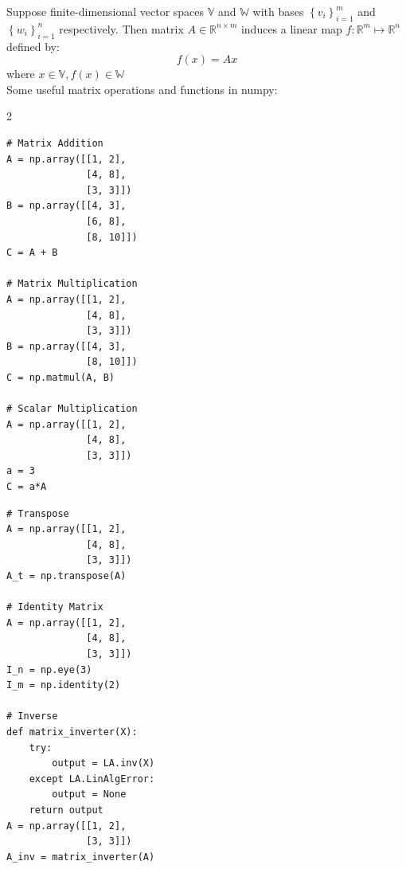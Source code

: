 Suppose finite-dimensional vector spaces $\mathbb{V}$ and $\mathbb{W}$ with
bases $\left\{ v_i \right\} _{i=1}^m$ and $\left\{ w_i \right\} _{i=1}^n$
respectively. Then matrix $A\in \mathbb{R}^{n\times m}$ induces a linear map
$f:\mathbb{R}^{m}\mapsto \mathbb{R}^{n}$ defined by:
\[f(x)=Ax\]
where $x\in \mathbb{V}, f(x)\in \mathbb{W}$\\
Some useful matrix operations and functions in numpy:
\begin{multicols}{2}
\begin{lstlisting}
# Matrix Addition
A = np.array([[1, 2],
              [4, 8],
              [3, 3]])
B = np.array([[4, 3],
              [6, 8],
              [8, 10]])
C = A + B

# Matrix Multiplication
A = np.array([[1, 2],
              [4, 8],
              [3, 3]])
B = np.array([[4, 3],
              [8, 10]])
C = np.matmul(A, B)

# Scalar Multiplication
A = np.array([[1, 2],
              [4, 8],
              [3, 3]])
a = 3
C = a*A
\end{lstlisting}
\begin{lstlisting}
# Transpose
A = np.array([[1, 2],
              [4, 8],
              [3, 3]])
A_t = np.transpose(A)

# Identity Matrix
A = np.array([[1, 2],
              [4, 8],
              [3, 3]])
I_n = np.eye(3)
I_m = np.identity(2)

# Inverse
def matrix_inverter(X):
    try:
        output = LA.inv(X)
    except LA.LinAlgError:
        output = None
    return output
A = np.array([[1, 2],
              [3, 3]])
A_inv = matrix_inverter(A)
\end{lstlisting}
\end{multicols}

